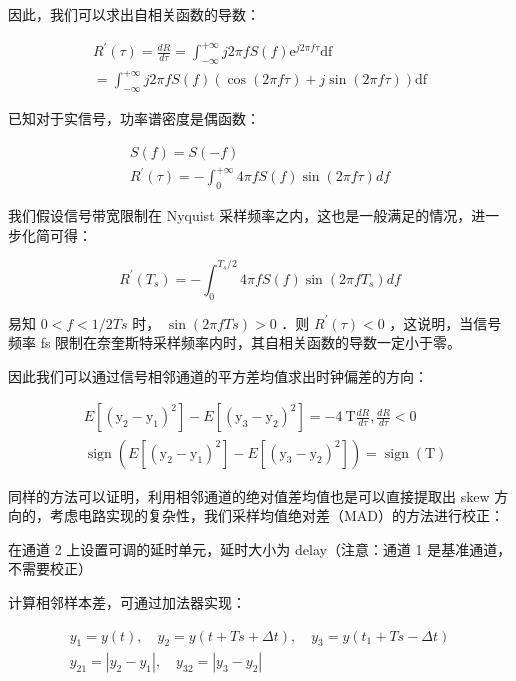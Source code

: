 \documentclass[cs4size,a4paper]{ctexart}
\numberwithin{equation}{section}
\numberwithin{table}{section}
\numberwithin{figure}{section}
\begin{document}
		因此，我们可以求出自相关函数的导数：
		
		$$
		\begin{gathered}
			R^{\prime}(\tau)=\frac{d R}{d \tau}=\int_{-\infty}^{+\infty} j 2 \pi f S(f) \mathrm{e}^{j 2 \pi f \tau} \mathrm{df} \\
			=\int_{-\infty}^{+\infty} j 2 \pi f S(f)(\cos (2 \pi f \tau)+j \sin (2 \pi f \tau)) \mathrm{df}
		\end{gathered}
		$$
		
		
		已知对于实信号，功率谱密度是偶函数：
		
		$$
		\begin{gathered}
			S(f)=S(-f) \\
			R^{\prime}(\tau)=-\int_0^{+\infty} 4 \pi f S(f) \sin (2 \pi f \tau) d f
		\end{gathered}
		$$
		
		
		我们假设信号带宽限制在 Nyquist 采样频率之内，这也是一般满足的情况，进一步化简可得：
		
		$$
		R^{\prime}(T_s)=-\int_0^{T_s / 2} 4 \pi f S(f) \sin (2 \pi f T_s) df
		$$
		
		
		易知 $0<f<1 / 2 T s$ 时， $\sin (2 \pi f T s)>0$ ．则 $R^{\prime}(\tau)<0$ ，这说明，当信号频率 fs 限制在奈奎斯特采样频率内时，其自相关函数的导数一定小于零。
		
		因此我们可以通过信号相邻通道的平方差均值求出时钟偏差的方向：
		
		$$
		\begin{aligned}
			& E\left[\left(\mathrm{y}_2-\mathrm{y}_1\right)^2\right]-E\left[\left(\mathrm{y}_3-\mathrm{y}_2\right)^2\right]=-4 \mathrm{~T} \frac{d R}{d \tau},   \frac{d R}{d \tau}<0 \\
			&\operatorname{sign}\left(E\left[\left(\mathrm{y}_2-\mathrm{y}_1\right)^2\right]-E\left[\left(\mathrm{y}_3-\mathrm{y}_2\right)^2\right]\right)=\operatorname{sign}(\mathrm{T})
		\end{aligned}
		$$
		
		
		同样的方法可以证明，利用相邻通道的绝对值差均值也是可以直接提取出 skew 方向的，考虑电路实现的复杂性，我们采样均值绝对差（MAD）的方法进行校正：
		
		在通道 2 上设置可调的延时单元，延时大小为 delay（注意：通道 1 是基准通道，不需要校正）
		
		\noindent
		计算相邻样本差，可通过加法器实现：
		
		$$
		\begin{gathered}
			y_1=y(t), \quad y_2=y(t+T s+\Delta t), \quad y_3=y(t_1+T s-\Delta t) \\
			y_{21}=\left|y_2-y_1\right|, \quad y_{32}=\left|y_3-y_2\right|
		\end{gathered}
		$$
		
\end{document}
